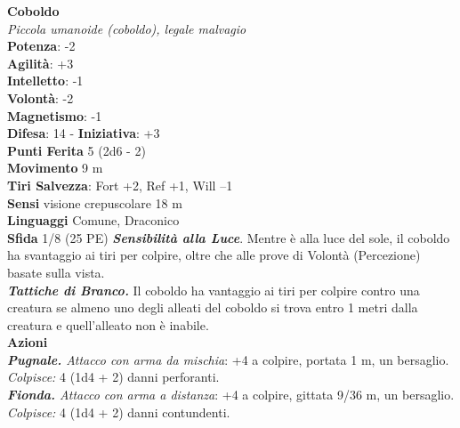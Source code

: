 \begin{multicols}{2}
\medskip\textbf{Coboldo}\\
\emph{Piccola umanoide (coboldo), legale malvagio}\\
\textbf{Potenza}: -2\\
\textbf{Agilità}: +3\\
\textbf{Intelletto}: -1\\
\textbf{Volontà}: -2\\
\textbf{Magnetismo}: -1\\
\textbf{Difesa}: 14 - \textbf{Iniziativa}: +3\\
\textbf{Punti Ferita} 5 (2d6 - 2)\\
\textbf{Movimento} 9 m\\
\textbf{Tiri Salvezza}: Fort +2, Ref +1, Will –1\\
\textbf{Sensi} visione crepuscolare 18 m\\
\textbf{Linguaggi} Comune, Draconico\\
\textbf{Sfida} 1/8 (25 PE)\smallskip
\emph{\textbf{Sensibilità alla Luce}}. Mentre è alla luce del sole, il coboldo ha svantaggio ai tiri per colpire, oltre che alle prove di Volontà (Percezione) basate sulla vista.\\
\emph{\textbf{Tattiche di Branco.}} Il coboldo ha vantaggio ai tiri per colpire contro una creatura se almeno uno degli alleati del coboldo si trova entro 1 metri dalla creatura e quell'alleato non è inabile. \\
\smallskip\textbf{Azioni}\\
\emph{\textbf{Pugnale.} Attacco con arma da mischia}: +4 a colpire, portata 1 m, un bersaglio.\\
\emph{Colpisce:} 4 (1d4 + 2) danni perforanti.\\
\emph{\textbf{Fionda.} Attacco con arma a distanza}: +4 a colpire, gittata 9/36 m, un bersaglio.\\
\emph{Colpisce:} 4 (1d4 + 2) danni contundenti.\\


\end{multicols}
